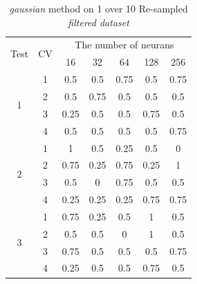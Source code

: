 \documentclass[draft,dvipsnames]{drexel-thesis}
\begin{document}
\begin{thesis}
\begin{table}[!t]
\centering
\caption{{\em gaussian} method on 1 over 10 Re-sampled {\em filtered dataset}}
\label{tbl:gaussian_1_10}
\begin{tabular}{|c|c|c|c|c|c|c|}
\hline
\multirow{2}{*}{Test} & \multirow{2}{*}{CV} & \multicolumn{5}{c|}{The number of neurans}                               \\ \cline{3-7} 
                      &                     & 16           & 32           & 64           & 128          & 256          \\ \hline
\multirow{4}{*}{1}    & 1                   & 0.5          & 0.5          & 0.75         & 0.5          & 0.75         \\ \cline{2-7} 
                      & 2                   & 0.5          & 0.75         & 0.5          & 0.5          & 0.5          \\ \cline{2-7} 
                      & 3                   & 0.25         & 0.5          & 0.5          & 0.75         & 0.5          \\ \cline{2-7} 
                      & 4                   & 0.5          & 0.5          & 0.5          & 0.5          & 0.75         \\ \hline
\multirow{4}{*}{2}    & 1                   & 1            & 0.5          & 0.25         & 0.5          & 0            \\ \cline{2-7} 
                      & 2                   & 0.75         & 0.25         & 0.75         & 0.25         & 1            \\ \cline{2-7} 
                      & 3                   & 0.5          & 0            & 0.75         & 0.5          & 0.5          \\ \cline{2-7} 
                      & 4                   & 0.25         & 0.25         & 0.25         & 0.75         & 0.75         \\ \hline
\multirow{4}{*}{3}    & 1                   & 0.75         & 0.25         & 0.5          & 1            & 0.5          \\ \cline{2-7} 
                      & 2                   & 0.5          & 0.5          & 0            & 1            & 0.5          \\ \cline{2-7} 
                      & 3                   & 0.75         & 0.5          & 0.5          & 0.5          & 0.75         \\ \cline{2-7} 
                      & 4                   & 0.25         & 0.5          & 0.5          & 0.75         & 0.5          \\ \hline

\end{tabular}
\end{table}
\end{thesis}
\end{document}
